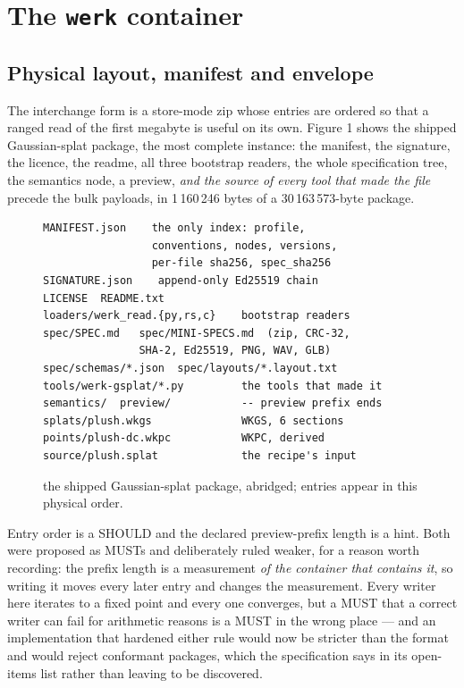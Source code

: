 \documentclass[10pt,twocolumn,letterpaper]{article}
\newcommand{\code}[1]{\texttt{\small #1}}
\begin{document}
\section{The \code{werk} container}

\subsection{Physical layout, manifest and envelope}

The interchange form is a store-mode zip whose entries are ordered so that a ranged read of the first megabyte is useful on its own. Figure 1 shows the shipped Gaussian-splat package, the most complete instance: the manifest, the signature, the licence, the readme, all three bootstrap readers, the whole specification tree, the semantics node, a preview, \emph{and the source of every tool that made the file} precede the bulk payloads, in 1\,160\,246 bytes of a 30\,163\,573-byte package.

\begin{figure}[t]\centering\small
\begin{minipage}{\columnwidth}\footnotesize\begin{verbatim}
MANIFEST.json    the only index: profile,
                 conventions, nodes, versions,
                 per-file sha256, spec_sha256
SIGNATURE.json    append-only Ed25519 chain
LICENSE  README.txt
loaders/werk_read.{py,rs,c}    bootstrap readers
spec/SPEC.md   spec/MINI-SPECS.md  (zip, CRC-32,
               SHA-2, Ed25519, PNG, WAV, GLB)
spec/schemas/*.json  spec/layouts/*.layout.txt
tools/werk-gsplat/*.py         the tools that made it
semantics/  preview/           -- preview prefix ends
splats/plush.wkgs              WKGS, 6 sections
points/plush-dc.wkpc           WKPC, derived
source/plush.splat             the recipe's input
\end{verbatim}\end{minipage}
\caption{the shipped Gaussian-splat package, abridged; entries appear in this physical order.}
\end{figure}

Entry order is a SHOULD and the declared preview-prefix length is a hint. Both were proposed as MUSTs and deliberately ruled weaker, for a reason worth recording: the prefix length is a measurement \emph{of the container that contains it}, so writing it moves every later entry and changes the measurement. Every writer here iterates to a fixed point and every one converges, but a MUST that a correct writer can fail for arithmetic reasons is a MUST in the wrong place --- and an implementation that hardened either rule would now be stricter than the format and would reject conformant packages, which the specification says in its open-items list rather than leaving to be discovered.
\end{document}
